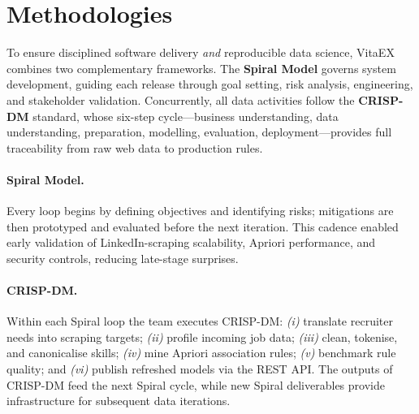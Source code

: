 \documentclass[runningheads]{llncs}
\begin{document}
\section{Methodologies}
\label{sec:methodologies}

To ensure disciplined software delivery \emph{and} reproducible data science, VitaEX combines two complementary frameworks.  
The \textbf{Spiral Model} governs system development, guiding each release through goal setting, risk analysis, engineering, and stakeholder validation.  
Concurrently, all data activities follow the \textbf{CRISP-DM} standard, whose six-step cycle—business understanding, data understanding, preparation, modelling, evaluation, deployment—provides full traceability from raw web data to production rules.

\paragraph{\textbf{Spiral Model.}}
Every loop begins by defining objectives and identifying risks; mitigations are then prototyped and evaluated before the next iteration.  
This cadence enabled early validation of LinkedIn-scraping scalability, Apriori performance, and security controls, reducing late-stage surprises.

\paragraph{\textbf{CRISP-DM.}}
Within each Spiral loop the team executes CRISP-DM:  
\emph{(i)} translate recruiter needs into scraping targets;  
\emph{(ii)} profile incoming job data;  
\emph{(iii)} clean, tokenise, and canonicalise skills;  
\emph{(iv)} mine Apriori association rules;  
\emph{(v)} benchmark rule quality; and  
\emph{(vi)} publish refreshed models via the REST API.  
The outputs of CRISP-DM feed the next Spiral cycle, while new Spiral deliverables provide infrastructure for subsequent data iterations.
\end{document}

